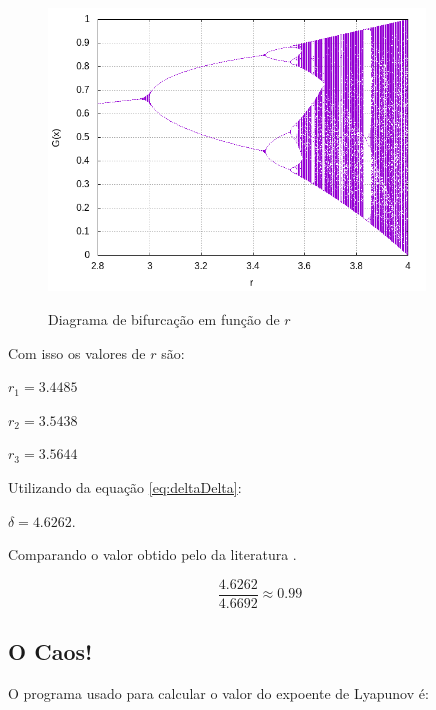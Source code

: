 \documentclass[a4paper, 12pt]{article}
\begin{document}
\begin{figure}[H]
	\centering
	\caption{Diagrama de bifurcação em função de $r$}{}
	\includegraphics[width=10.0cm]{lambdaCloser.png}
	\label{fig:lambda}
\end{figure}
 
 
 Com isso os valores de $r$ são:
 
$r_1 = 3.4485$

$r_2 = 3.5438$

$r_3 = 3.5644$


\hspace{0.5cm}

Utilizando da equação \ref{eq:deltaDelta}:

\hspace{0.5cm}

\centering $\delta = 4.6262$.

\hspace{0.5cm}
	
	
Comparando o valor obtido pelo da literatura \cite{wiki}.

\begin{equation*}
  \frac{4.6262}{4.6692} \approx 0.99
\end{equation*}



\subsection{O Caos!}

O programa usado para calcular o valor do expoente de Lyapunov é:

\hspace{0.5cm}
\end{document}
